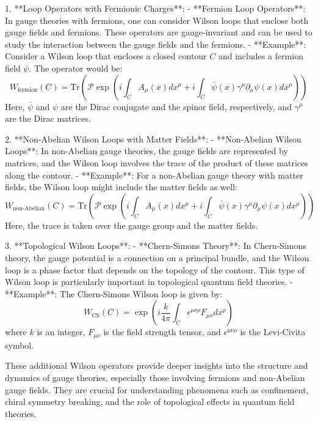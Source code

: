 1. **Loop Operators with Fermionic Charges**:
   - **Fermion Loop Operators**: In gauge theories with fermions, one can consider Wilson loops that enclose both gauge fields and fermions. These operators are gauge-invariant and can be used to study the interaction between the gauge fields and the fermions.
   - **Example**: Consider a Wilson loop that encloses a closed contour \( C \) and includes a fermion field \( \psi \). The operator would be:
     \[
     W_{\text{fermion}}(C) = \text{Tr} \left( \mathcal{P} \exp \left( i \int_C A_\mu(x) dx^\mu + i \int_C \bar{\psi}(x) \gamma^\mu \partial_\mu \psi(x) dx^\mu \right) \right)
     \]
     Here, \( \bar{\psi} \) and \( \psi \) are the Dirac conjugate and the spinor field, respectively, and \( \gamma^\mu \) are the Dirac matrices.

2. **Non-Abelian Wilson Loops with Matter Fields**:
   - **Non-Abelian Wilson Loops**: In non-Abelian gauge theories, the gauge fields are represented by matrices, and the Wilson loop involves the trace of the product of these matrices along the contour.
   - **Example**: For a non-Abelian gauge theory with matter fields, the Wilson loop might include the matter fields as well:
     \[
     W_{\text{non-Abelian}}(C) = \text{Tr} \left( \mathcal{P} \exp \left( i \int_C A_\mu(x) dx^\mu + i \int_C \bar{\psi}(x) \gamma^\mu \partial_\mu \psi(x) dx^\mu \right) \right)
     \]
     Here, the trace is taken over the gauge group and the matter fields.

3. **Topological Wilson Loops**:
   - **Chern-Simons Theory**: In Chern-Simons theory, the gauge potential is a connection on a principal bundle, and the Wilson loop is a phase factor that depends on the topology of the contour. This type of Wilson loop is particularly important in topological quantum field theories.
   - **Example**: The Chern-Simons Wilson loop is given by:
     \[
     W_{\text{CS}}(C) = \exp \left( i \frac{k}{4\pi} \int_C \epsilon^{\mu\nu\rho} F_{\mu\nu} dx^\rho \right)
     \]
     where \( k \) is an integer, \( F_{\mu\nu} \) is the field strength tensor, and \( \epsilon^{\mu\nu\rho} \) is the Levi-Civita symbol.

These additional Wilson operators provide deeper insights into the structure and dynamics of gauge theories, especially those involving fermions and non-Abelian gauge fields. They are crucial for understanding phenomena such as confinement, chiral symmetry breaking, and the role of topological effects in quantum field theories.